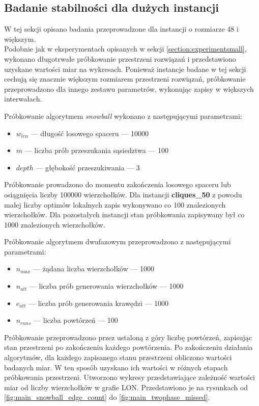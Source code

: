 \newpage

\subsection{Badanie stabilności dla dużych instancji} \label{section:experimentmain}
W tej sekcji opisano badania przeprowadzone dla instancji o rozmiarze 48 i większym. \\
Podobnie jak w eksperymentach opisanych w sekcji \ref{section:experimentsmall}, wykonano długotrwałe próbkowanie przestrzeni rozwiązań
i przedstawiono uzyskane wartości miar na wykresach.
Ponieważ instancje badane w tej sekcji cechują się znacznie większym rozmiarem przestrzeni rozwiązań, próbkowanie przeprowadzono
dla innego zestawu parametrów, wykonując zapisy w większych interwałach.

Próbkowanie algorytmem \textit{snowball} wykonano z następującymi parametrami:
\begin{itemize}
    \item $w_{len}$ --- długość losowego spaceru --- 10000
    \item $m$ --- liczba prób przeszukania sąsiedztwa --- 100
    \item $depth$ --- głębokość przeszukiwania --- 3
\end{itemize}

Próbkowanie prowadzono do momentu zakończenia losowego spaceru lub osiągnięcia liczby 100000 wierzchołków.
Dla instancji \textbf{cliques\_50} z powodu małej liczby optimów lokalnych zapis wykonywano co 100 znalezionych wierzchołków.
Dla pozostałych instancji stan próbkowania zapisywany był co 1000 znalezionych wierzchołków.

Próbkowanie algorytmem dwufazowym przeprowadzono z następującymi parametrami:
\begin{itemize}
    \item $n_{max}$ --- żądana liczba wierzchołków --- 1000
    \item $n_{att}$ --- liczba prób generowania wierzchołków --- 1000
    \item $e_{att}$ --- liczba prób generowania krawędzi --- 1000
    \item $n_{runs}$ --- liczba powtórzeń --- 100
\end{itemize}

Próbkowanie przeprowadzono przez ustaloną z góry liczbę powtórzeń, zapisując stan przestrzeni po zakończeniu każdego powtórzenia.
Po zakończeniu działania algorytmów, dla każdego zapisanego stanu przestrzeni obliczono wartości badanych miar. W ten sposób uzyskano
ich wartości w różnych etapach próbkowania przestrzeni.
Utworzono wykresy przedstawiające zależność wartości miar od liczby wierzchołków w grafie LON.
Przedstawiono je na rysunkach od \ref{fig:main_snowball_edge_count} do \ref{fig:main_twophase_missed}.


